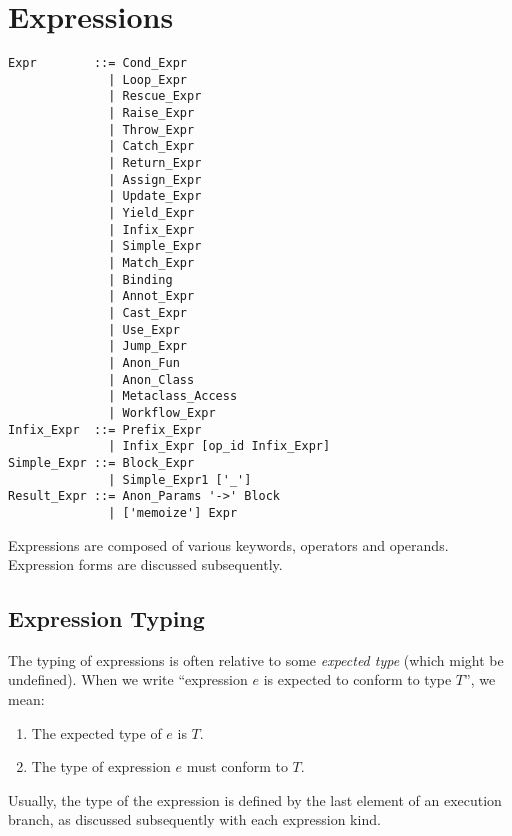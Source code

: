 
\chapter{Expressions}


\syntax\begin{lstlisting}
Expr        ::= Cond_Expr
              | Loop_Expr
              | Rescue_Expr
              | Raise_Expr
              | Throw_Expr
              | Catch_Expr
              | Return_Expr
              | Assign_Expr
              | Update_Expr
              | Yield_Expr
              | Infix_Expr
              | Simple_Expr
              | Match_Expr
              | Binding
              | Annot_Expr
              | Cast_Expr
              | Use_Expr
              | Jump_Expr
              | Anon_Fun
              | Anon_Class
              | Metaclass_Access
              | Workflow_Expr
Infix_Expr  ::= Prefix_Expr
              | Infix_Expr [op_id Infix_Expr]
Simple_Expr ::= Block_Expr
              | Simple_Expr1 ['_']
Result_Expr ::= Anon_Params '->' Block 
              | ['memoize'] Expr
\end{lstlisting}

Expressions are composed of various keywords, operators and operands. Expression forms are discussed subsequently. 







\section{Expression Typing}

The typing of expressions is often relative to some {\em expected type} (which might be undefined). When we write ``expression $e$ is expected to conform to type $T$'', we mean:
\begin{enumerate}
\item The expected type of $e$ is $T$.
\item The type of expression $e$ must conform to $T$. 
\end{enumerate}

Usually, the type of the expression is defined by the last element of an execution branch, as discussed subsequently with each expression kind. 

